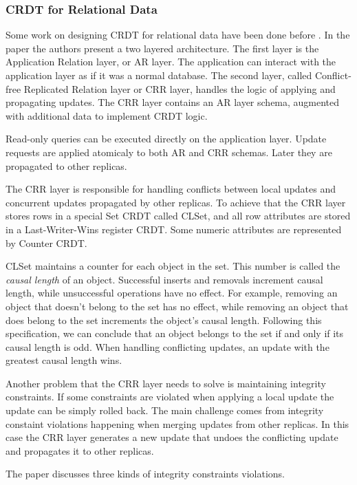 \documentclass[a4paper, 11pt, oneside]{article}
\theoremstyle{definition}
\begin{document}
\subsubsection{CRDT for Relational Data}

Some work on designing CRDT for relational data have been done before \cite{relcrdt}. In the paper the authors present a two layered architecture. The first layer is the Application Relation layer, or AR layer. The application can interact with the application layer as if it was a normal database. The second layer, called Conflict-free Replicated Relation layer or CRR layer, handles the logic of applying and propagating updates. The CRR layer contains an AR layer schema, augmented with additional data to implement CRDT logic.

Read-only queries can be executed directly on the application layer. Update requests are applied atomicaly to both AR and CRR schemas. Later they are propagated to other replicas.

The CRR layer is responsible for handling conflicts between local updates and concurrent updates propagated by other replicas. To achieve that the CRR layer stores rows in a special Set CRDT called CLSet, and all row attributes are stored in a Last-Writer-Wins register CRDT. Some numeric attributes are represented by Counter CRDT.

CLSet maintains a counter for each object in the set. This number is called the \textit{causal length} of an object. Successful inserts and removals increment causal length, while unsuccessful operations have no effect. For example, removing an object that doesn't belong to the set has no effect, while removing an object that does belong to the set increments the object's causal length. Following this specification, we can conclude that an object belongs to the set if and only if its causal length is odd. When handling conflicting updates, an update with the greatest causal length wins.

Another problem that the CRR layer needs to solve is maintaining integrity constraints. If some constraints are violated when applying a local update the update can be simply rolled back. The main challenge comes from integrity constaint violations happening when merging updates from other replicas. In this case the CRR layer generates a new update that undoes the conflicting update and propagates it to other replicas.

The paper discusses three kinds of integrity constraints violations. 
\end{document}
